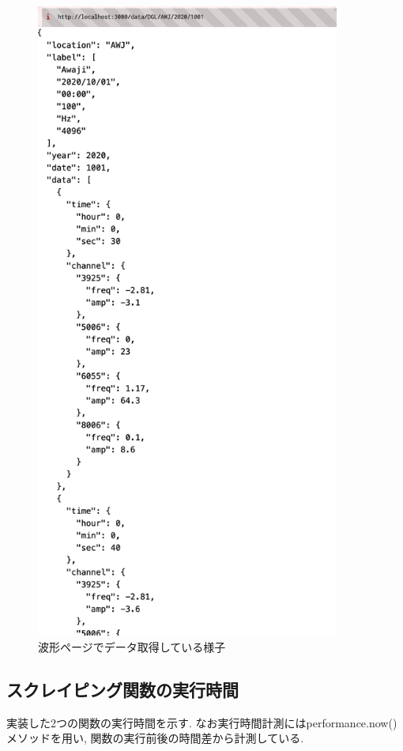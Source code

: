 \begin{figure}[htbp]
	\begin{center}
		\includegraphics[width=100mm]{./images/wave-page-image.png}
		\caption{波形ページでデータ取得している様子}\label{fig:wave-page-image}
	\end{center}
\end{figure}


\subsection{スクレイピング関数の実行時間}
実装した2つの関数の実行時間を示す.
なお実行時間計測にはperformance.now()メソッドを用い, 関数の実行前後の時間差から計測している.

